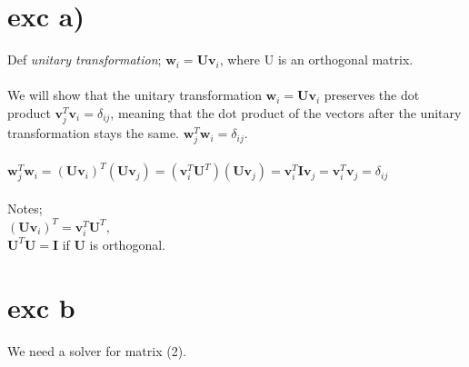 \documentclass[12pt,a4paper]{article}
\begin{document}
\section{exc a)}

Def \textit{unitary transformation}; $\textbf{w}_i = \textbf{U}\textbf{v}_i$, where U is an orthogonal matrix.\\
\\
We will show that the unitary transformation $\textbf{w}_i = \textbf{U}\textbf{v}_i$ preserves the dot product $\textbf{v}_j^T\textbf{v}_i = \delta_{ij}$, meaning that the dot product of the vectors after the unitary transformation stays the same. $\textbf{w}_j^T\textbf{w}_i = \delta_{ij}$.\\
\\
$\textbf{w}_j^T\textbf{w}_i = (\textbf{U}\textbf{v}_i)^T(\textbf{U}\textbf{v}_j) = (\textbf{v}_i^T\textbf{U}^T)(\textbf{U}\textbf{v}_j) = \textbf{v}_i^T\textbf{I}\textbf{v}_j = \textbf{v}_i^T\textbf{v}_j = \delta_{ij}$\\
\\
Notes;\\
$(\textbf{U}\textbf{v}_i)^T = \textbf{v}_i^T\textbf{U}^T$,\\
$\textbf{U}^T\textbf{U} = \textbf{I}$ if $\textbf{U}$ is orthogonal.

\section{exc b}
We need a solver for matrix (2).\\
\end{document}
